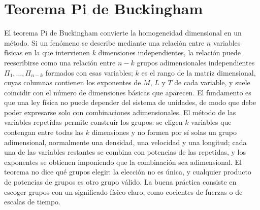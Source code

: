\documentclass[10pt,openany]{book}
\begin{document}
\section{Teorema Pi de Buckingham}

El teorema Pi de Buckingham convierte la homogeneidad dimensional en un método. Si un fenómeno se describe mediante una relación entre \(n\) variables físicas en la que intervienen \(k\) dimensiones independientes, la relación puede reescribirse como una relación entre \(n - k\) grupos adimensionales independientes \(\Pi_1, \ldots, \Pi_{n-k}\) formados con esas variables; \(k\) es el rango de la matriz dimensional, cuyas columnas contienen los exponentes de \(M\), \(L\) y \(T\) de cada variable, y suele coincidir con el número de dimensiones básicas que aparecen. El fundamento es que una ley física no puede depender del sistema de unidades, de modo que debe poder expresarse solo con combinaciones adimensionales. El método de las variables repetidas permite construir los grupos: se eligen \(k\) variables que contengan entre todas las \(k\) dimensiones y no formen por sí solas un grupo adimensional, normalmente una densidad, una velocidad y una longitud; cada una de las variables restantes se combina con potencias de las repetidas, y los exponentes se obtienen imponiendo que la combinación sea adimensional. El teorema no dice qué grupos elegir: la elección no es única, y cualquier producto de potencias de grupos es otro grupo válido. La buena práctica consiste en escoger grupos con un significado físico claro, como cocientes de fuerzas o de escalas de tiempo.
\end{document}
